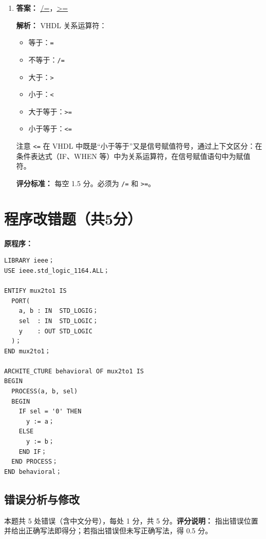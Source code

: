 \begin{enumerate}[label=\arabic*.]
\item \textbf{答案：} \underline{/=}，\underline{>=}

\textbf{解析：} VHDL 关系运算符：
\begin{itemize}
    \item 等于：\texttt{=}
    \item 不等于：\texttt{/=}
    \item 大于：\texttt{>}
    \item 小于：\texttt{<}
    \item 大于等于：\texttt{>=}
    \item 小于等于：\texttt{<=}
\end{itemize}

注意 \texttt{<=} 在 VHDL 中既是“小于等于”又是信号赋值符号，通过上下文区分：在条件表达式（IF、WHEN 等）中为关系运算符，在信号赋值语句中为赋值符。

\textbf{评分标准：} 每空 1.5 分。必须为 \texttt{/=} 和 \texttt{>=}。

\end{enumerate}

\section{程序改错题（共5分）}

\textbf{原程序：}
\begin{lstlisting}[style=Vivado]
LIBRARY ieee；
USE ieee.std_logic_1164.ALL；

ENTIFY mux2to1 IS
  PORT(
    a, b : IN  STD_LOGIG；
    sel  : IN  STD_LOGIC；
    y    : OUT STD_LOGIC
  )；
END mux2to1；

ARCHITE_CTURE behavioral OF mux2to1 IS
BEGIN
  PROCESS(a, b, sel)
  BEGIN
    IF sel = '0' THEN
      y := a；
    ELSE
      y := b；
    END IF；
  END PROCESS；
END behavioral；
\end{lstlisting}

\subsection*{错误分析与修改}

本题共 5 处错误（含中文分号），每处 1 分，共 5 分。\textbf{评分说明：} 指出错误位置并给出正确写法即得分；若指出错误但未写正确写法，得 0.5 分。

